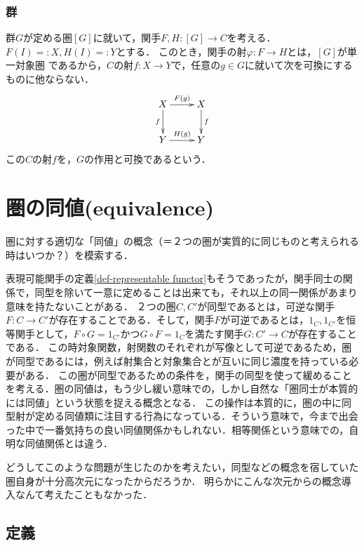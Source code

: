 \documentclass[uplatex, dvipdfmx]{jsreport}
\begin{document}
\subsection{群}

\begin{definition}[群の作用と可換]
    群$G$が定める圏$[G]$に就いて，関手$F,H:[G]\to C$を考える．$F(I)=:X,H(I)=:Y$とする．
    このとき，関手の射$\varphi:F\to H$とは，$[G]$が単一対象圏
    であるから，$C$の射$f:X\to Y$で，任意の$g\in G$に就いて次を可換にするものに他ならない．
    \[\xymatrix{
        X\ar[r]^-{F(g)}\ar[d]_-f&X\ar[d]^-f\\
        Y\ar[r]^-{H(g)}&Y
    }\]
    この$C$の射$f$を，$G$の作用と可換であるという．
\end{definition}

\chapter{圏の同値(equivalence)}

圏に対する適切な「同値」の概念（＝２つの圏が実質的に同じものと考えられる時はいつか？）を模索する．

表現可能関手の定義\ref{def-representable functor}もそうであったが，関手同士の関係で，同型を除いて一意に定めることは出来ても，それ以上の同一関係があまり意味を持たないことがある．
２つの圏$C,C'$が同型であるとは，可逆な関手$F:C\to C'$が存在することである．そして，関手$F$が可逆であるとは，$1_C,1_{C'}$を恒等関手として，$F\circ G=1_{C'}$かつ$G\circ F=1_C$を満たす関手$G:C'\to C$が存在することである．
この時対象関数，射関数のそれぞれが写像として可逆であるため，圏が同型であるには，例えば射集合と対象集合とが互いに同じ濃度を持っている必要がある．
この圏が同型であるための条件を，関手の同型を使って緩めることを考える．圏の同値は，もう少し緩い意味での，しかし自然な「圏同士が本質的には同値」という状態を捉える概念となる．
この操作は本質的に，圏の中に同型射が定める同値類に注目する行為になっている．そういう意味で，今まで出会った中で一番気持ちの良い同値関係かもしれない．相等関係という意味での，自明な同値関係とは違う．

どうしてこのような問題が生じたのかを考えたい，同型などの概念を宿していた圏自身が十分高次元になったからだろうか．
明らかにこんな次元からの概念導入なんて考えたこともなかった．

\section{定義}
\end{document}
